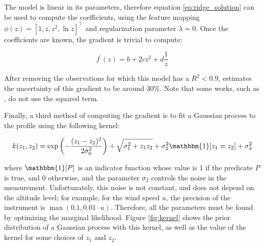\documentclass[a4paper]{book}
\begin{document}
The model is linear in its parameters, therefore equation \ref{eq:ridge_solution} can be used to compute the coefficients, using the feature mapping $\phi(z)=\left[1,z,z^2,\ln z\right]^\intercal$ and regularization parameter $\lambda=0$. Once the coefficients are known, the gradient is trivial to compute:

\begin{equation}
\label{eq:log_gradient}
f^\prime(z)=b+2cz^2+d\frac{1}{z}
\end{equation}

After removing the observations for which this model has a $R^2<0.9$, \cite{windlogprofile} estimates the uncertainty of this gradient to be around 30\%. Note that some works, such as \cite{windprof_nosqr}, do not use the squared term.

Finally, a third method of computing the gradient is to fit a Gaussian process to the profile using the following kernel:

\begin{equation}
\label{eq:kernel}
k(z_1,z_2)=\exp\left(-\frac{(z_1-z_2)^2}{2\sigma_0^2}\right)+\sqrt{\sigma_1^2+ z_1 z_2}+\sigma_2^2 \mathbbm{1}[z_1=z_2]+\sigma_3^2
\end{equation}

\noindent where $\mathbbm{1}[P]$ is an indicator function whose value is 1 if the predicate $P$ is true, and 0 otherwise, and the parameter $\sigma_2$ controls the noise in the measurement. Unfortunately, this noise is not constant, and does not depend on the altitude level; for example, for the wind speed $u$, the precision of the instrument is $\max(0.1,0.01\cdot u)$. Therefore, all the parameters must be found by optimizing the marginal likelihood. Figure \ref{fig:kernel} shows the prior distribution of a Gaussian process with this kernel, as well as the value of the kernel for some choices of $z_1$ and $z_2$.
\end{document}
